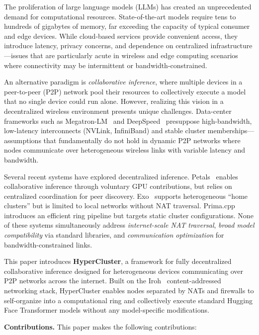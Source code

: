 \documentclass[runningheads]{llncs}
\begin{document}
The proliferation of large language models (LLMs) has created an unprecedented demand for computational resources. State-of-the-art models require tens to hundreds of gigabytes of memory, far exceeding the capacity of typical consumer and edge devices. While cloud-based services provide convenient access, they introduce latency, privacy concerns, and dependence on centralized infrastructure---issues that are particularly acute in wireless and edge computing scenarios where connectivity may be intermittent or bandwidth-constrained.

An alternative paradigm is \emph{collaborative inference}, where multiple devices in a peer-to-peer (P2P) network pool their resources to collectively execute a model that no single device could run alone. However, realizing this vision in a decentralized wireless environment presents unique challenges. Data-center frameworks such as Megatron-LM~\cite{shoeybi2019megatron} and DeepSpeed~\cite{rasley2020deepspeed} presuppose high-bandwidth, low-latency interconnects (NVLink, InfiniBand) and stable cluster memberships---assumptions that fundamentally do not hold in dynamic P2P networks where nodes communicate over heterogeneous wireless links with variable latency and bandwidth.

Several recent systems have explored decentralized inference. Petals~\cite{borzunov2023petals} enables collaborative inference through voluntary GPU contributions, but relies on centralized coordination for peer discovery. Exo~\cite{exo} supports heterogeneous ``home clusters'' but is limited to local networks without NAT traversal. Prima.cpp~\cite{li2025prima} introduces an efficient ring pipeline but targets static cluster configurations. None of these systems simultaneously address \emph{internet-scale NAT traversal}, \emph{broad model compatibility} via standard libraries, and \emph{communication optimization} for bandwidth-constrained links.

This paper introduces \textbf{HyperCluster}, a framework for fully decentralized collaborative inference designed for heterogeneous devices communicating over P2P networks across the internet. Built on the Iroh~\cite{iroh2024} content-addressed networking stack, HyperCluster enables nodes separated by NATs and firewalls to self-organize into a computational ring and collectively execute standard Hugging Face Transformer models without any model-specific modifications.

\smallskip
\noindent\textbf{Contributions.} This paper makes the following contributions:
\end{document}
